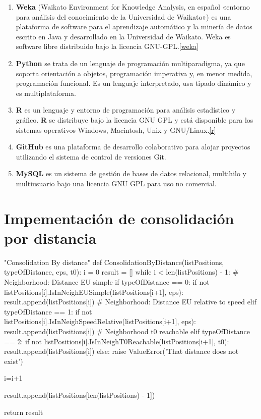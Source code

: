 \documentclass[a4paper, 12pt]{article}
\begin{document}
\begin{enumerate}
	\item \textbf{Weka} (Waikato Environment for Knowledge Analysis, en espa\~nol «entorno para an\'alisis del conocimiento de la Universidad de Waikato») es una plataforma de software para el aprendizaje autom\'atico y la miner\'ia de datos escrito en Java y desarrollado en la Universidad de Waikato. Weka es software libre distribuido bajo la licencia GNU-GPL.\ref{weka}
	
	\item \textbf{Python} se trata de un lenguaje de programaci\'on multiparadigma, ya que soporta orientaci\'on a objetos, programaci\'on imperativa y, en menor medida, programaci\'on funcional. Es un lenguaje interpretado, usa tipado dinámico y es multiplataforma.
	
	\item \textbf{R} es un lenguaje y entorno de programaci\'on para an\'alisis estad\'istico y gr\'afico. \textbf{R} se distribuye bajo la licencia GNU GPL y est\'a disponible para los sistemas operativos Windows, Macintosh, Unix y GNU/Linux.\ref{r}
	
	\item \textbf{GitHub} es una plataforma de desarrollo colaborativo para alojar proyectos utilizando el sistema de control de versiones Git.
	
	\item \textbf{MySQL} es un sistema de gesti\'on de bases de datos relacional, multihilo y multiusuario bajo una licencia GNU GPL para uso no comercial.
	
\end{enumerate}


\newpage


\appendix


\section{Impementaci\'on de consolidaci\'on por distancia} \label{App:AppendixA}

\begin{python}
"Consolidation By distance"
def ConsolidationByDistance(listPositions, typeOfDistance, eps, t0):
	i = 0
	result = []
	while i < len(listPositions) - 1:
		# Neighborhood: Distance EU simple
		if typeOfDistance == 0:
			if not listPositions[i].IsInNeighEUSimple(listPositions[i+1], eps):
				result.append(listPositions[i])
		# Neighborhood: Distance EU relative to speed
		elif typeOfDistance == 1:
			if not listPositions[i].IsInNeighSpeedRelative(listPositions[i+1], eps):
				result.append(listPositions[i])
		# Neighborhood t0 reachable
		elif typeOfDistance == 2:
			if not listPositions[i].IsInNeighT0Reachable(listPositions[i+1], t0):
				result.append(listPositions[i])
		else:
			raise ValueError('That distance does not exist')

		i=i+1

	result.append(listPositions[len(listPositions) - 1])

	return result

\end{python}
\end{document}
